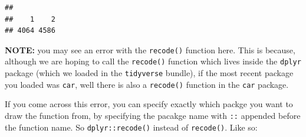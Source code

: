 \documentclass[
]{book}
\newenvironment{Shaded}{\begin{snugshade}}{\end{snugshade}}
\newcommand{\AttributeTok}[1]{\textcolor[rgb]{0.77,0.63,0.00}{#1}}
\newcommand{\CommentTok}[1]{\textcolor[rgb]{0.56,0.35,0.01}{\textit{#1}}}
\newcommand{\DecValTok}[1]{\textcolor[rgb]{0.00,0.00,0.81}{#1}}
\newcommand{\FunctionTok}[1]{\textcolor[rgb]{0.00,0.00,0.00}{#1}}
\newcommand{\NormalTok}[1]{#1}
\newcommand{\OtherTok}[1]{\textcolor[rgb]{0.56,0.35,0.01}{#1}}
\newcommand{\SpecialCharTok}[1]{\textcolor[rgb]{0.00,0.00,0.00}{#1}}
\newcommand{\StringTok}[1]{\textcolor[rgb]{0.31,0.60,0.02}{#1}}
\begin{document}
\begin{Shaded}
\end{Shaded}

\begin{verbatim}
## 
##    1    2 
## 4064 4586
\end{verbatim}

\begin{Shaded}
\end{Shaded}

\textbf{NOTE:} you may see an error with the \texttt{recode()} function here. This is because, although we are hoping to call the \texttt{recode()} function which lives inside the \texttt{dplyr} package (which we loaded in the \texttt{tidyverse} bundle), if the most recent package you loaded was \texttt{car}, well there is also a \texttt{recode()} function in the \texttt{car} package.

If you come across this error, you can specify exactly which packge you want to draw the function from, by specifying the pacakge name with \texttt{::} appended before the function name. So \texttt{dplyr::recode()} instead of \texttt{recode()}. Like so:

\begin{Shaded}
\end{Shaded}
\end{document}
